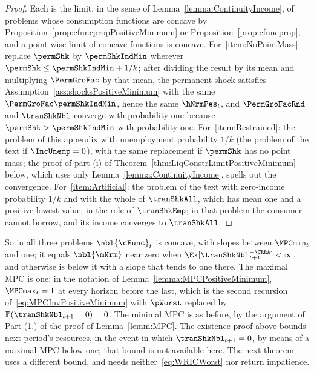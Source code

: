 \documentclass[\econtexRoot/BufferStockTheory]{subfiles}
\begin{document}
\begin{proof}
Each is the limit, in the sense of Lemma~\ref{lemma:ContinuityIncome}, of problems whose consumption functions are concave by Proposition~\ref{prop:cfuncpropPositiveMinimum} or Proposition~\ref{prop:cfuncprop}, and a point-wise limit of concave functions is concave.
For~\ref{item:NoPointMass}: replace $\permShk$ by $\permShkIndMin$ wherever $\permShk\leq\permShkIndMin+1/k$; after dividing the result by its mean and multiplying $\PermGroFac$ by that mean, the permanent shock satisfies Assumption~\ref{ass:shocksPositiveMinimum} with the same $\PermGroFac\permShkIndMin$, hence the same $\hNrmPes_{t}$, and $\PermGroFacRnd$ and $\tranShkNbl$ converge with probability one because $\permShk>\permShkIndMin$ with probability one.
For~\ref{item:Restrained}: the problem of this appendix with unemployment probability $1/k$ (the problem of the text if $\IncUnemp=0$), with the same replacement if $\permShk$ has no point mass; the proof of part (i) of Theorem~\ref{thm:LiqConstrLimitPositiveMinimum} below, which uses only Lemma~\ref{lemma:ContinuityIncome}, spells out the convergence.
For~\ref{item:Artificial}: the problem of the text with zero-income probability $1/k$ and with the whole of $\tranShkAll$, which has mean one and a positive lowest value, in the role of $\tranShkEmp$; in that problem the consumer cannot borrow, and its income converges to $\tranShkAll$.
\end{proof}

So in all three problems $\nbl{\cFunc}_{t}$ is concave, with slopes between $\MPCmin_{t}$ and one; it equals $\nbl{\mNrm}$ near zero when $\Ex[\tranShkNbl_{t+1}^{-\CRRA}]<\infty$, and otherwise is below it with a slope that tends to one there.
The maximal MPC is one: in the notation of Lemma~\ref{lemma:MPCPositiveMinimum}, $\MPCmax_{t}=1$ at every horizon before the last, which is the second recursion of~\eqref{eq:MPCInvPositiveMinimum} with $\pWorst$ replaced by $\mathbb{P}(\tranShkNbl_{t+1}=0)=0$.
The minimal MPC is as before, by the argument of Part (1.) of the proof of Lemma~\ref{lemm:MPC}.
The existence proof above bounds next period's resources, in the event in which $\tranShkNbl_{t+1}=0$, by means of a maximal MPC below one; that bound is not available here.
The next theorem uses a different bound, and needs neither~\eqref{eq:WRICWorst} nor return impatience.
\end{document}
